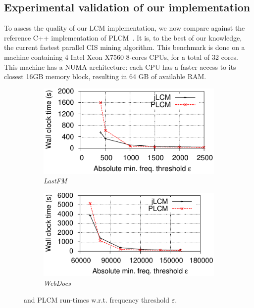 \subsection{Experimental validation of our implementation}
\label{sec:jlcm:validation}

To assess the quality of our LCM implementation,
we now compare \jlcm against the reference C++
implementation of PLCM~\cite{NegrevergneHPCS10}.
It is, to the best of our knowledge,
the current fastest parallel CIS mining algorithm.
This benchmark is done on a machine containing 4 Intel Xeon X7560 8-cores CPUs,
for a total of 32 cores.
This machine has a NUMA architecture: each CPU has a faster access to its closest 16GB memory block,
resulting in 64 GB of available RAM.

\begin{figure}
	\centering
	\begin{subfigure}[b]{0.48\textwidth}
		\includegraphics{fig/jlcm/allClosedRuntime/runtimePerSupport-lastfm.pdf}
		\caption{\emph{LastFM}}
		\label{fig:jlcmLastfm}
	\end{subfigure}
	\hfill
	\begin{subfigure}[b]{0.48\textwidth}
		\includegraphics{fig/jlcm/allClosedRuntime/runtimePerSupport-webdocs.pdf}
		\caption{\emph{WebDocs}}
		\label{fig:jlcmWebDocs}
	\end{subfigure}
	\caption{
		\jlcm and PLCM run-times w.r.t. frequency threshold $\varepsilon$.
	}
\end{figure}

